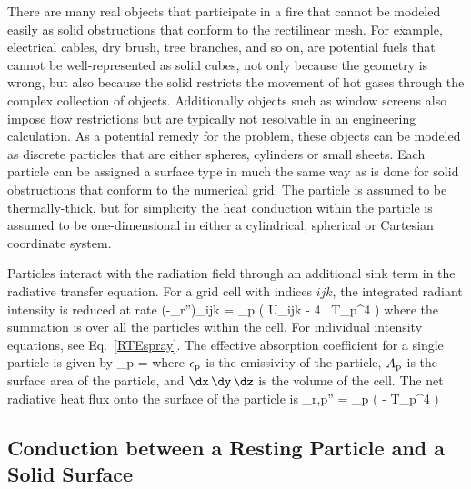 There are many real objects that participate in a fire that cannot be modeled easily as solid obstructions that conform to the rectilinear mesh. For example, electrical cables, dry brush, tree branches, and so on, are potential fuels that cannot be well-represented as solid cubes, not only because the geometry is wrong, but also because the solid restricts the movement of hot gases through the complex collection of objects.  Additionally objects such as window screens also impose flow restrictions but are typically not resolvable in an engineering calculation. As a potential remedy for the problem, these objects can be modeled as discrete particles that are either spheres, cylinders or small sheets. Each particle can be assigned a surface type in much the same way as is done for solid obstructions that conform to the numerical grid. The particle is assumed to be thermally-thick, but for simplicity the heat conduction within the particle is assumed to be one-dimensional in either a cylindrical, spherical or Cartesian coordinate system.

Particles interact with the radiation field through an additional sink term in the radiative transfer equation. For a grid cell with indices $ijk$, the integrated radiant intensity is reduced at rate
\be \label{eq:qr}
   (-\nabla \cdot \dot{\bq}_{\rm r}'')_{ijk} = \sum \kappa_{\rm p} \left( U_{ijk} - 4 \sigma \, T_{\rm p}^4 \right)
\ee
where the summation is over all the particles within the cell. For individual intensity equations, see Eq.~\ref{RTEspray}. The effective absorption coefficient for a single particle is given by
\be
   \kappa_{\rm p} = 
\ee
where $\epsilon_{\rm p}$ is the emissivity of the particle, $A_{\rm p}$ is the surface area of the particle, and $\dx \, \dy \, \dz$ is the volume of the cell. The net radiative heat flux onto the surface of the particle is
\be
   \dq_{\rm r,p}'' = \epsilon_{\rm p} \left(  - \sigma T_{\rm p}^4 \right)
\ee


\subsection{Conduction between a Resting Particle and a Solid Surface}
\label{particle_contact}

